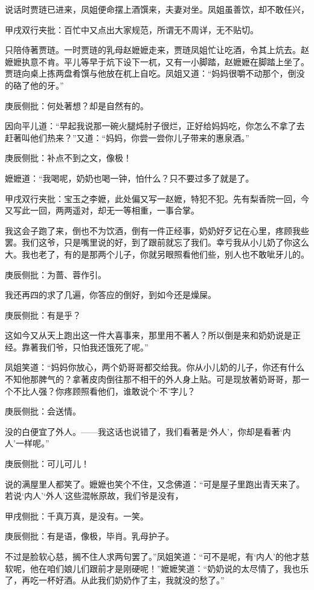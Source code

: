 \begin{parag}


    说话时贾琏已进来，凤姐便命摆上酒馔来，夫妻对坐。凤姐虽善饮，却不敢任兴，\begin{note}甲戌双行夹批：百忙中又点出大家规范，所谓无不周详，无不贴切。\end{note}只陪侍著贾琏。一时贾琏的乳母赵嬷嬷走来，贾琏凤姐忙让吃酒，令其上炕去。赵嬷嬷执意不肯。平儿等早于炕下设下一杌，又有一小脚踏，赵嬷嬷在脚踏上坐了。贾琏向桌上拣两盘肴馔与他放在杌上自吃。凤姐又道：“妈妈很嚼不动那个，倒没的硌了他的牙。”\begin{note}庚辰侧批：何处著想？却是自然有的。\end{note}因向平儿道：“早起我说那一碗火腿炖肘子很烂，正好给妈妈吃，你怎么不拿了去赶著叫他们热来？”又道：“妈妈，你尝一尝你儿子带来的惠泉酒。”\begin{note}庚辰侧批：补点不到之文，像极！\end{note}嬷嬷道：“我喝呢，奶奶也喝一钟，怕什么？只不要过多了就是了。\begin{note}甲戌双行夹批：宝玉之李嬷，此处偏又写一赵嬷，特犯不犯。先有梨香院一回，今又写此一回，两两遥对，却无一等相重，一事合掌。\end{note}我这会子跑了来，倒也不为饮酒，倒有一件正经事，奶奶好歹记在心里，疼顾我些罢。我们这爷，只是嘴里说的好，到了跟前就忘了我们。幸亏我从小儿奶了你这么大。我也老了，有的是那两个儿子，你就另眼照看他们些，别人也不敢呲牙儿的。\begin{note}庚辰侧批：为蔷、蓉作引。\end{note}我还再四的求了几遍，你答应的倒好，到如今还是燥屎。\begin{note}庚辰侧批：有是乎？\end{note}这如今又从天上跑出这一件大喜事来，那里用不著人？所以倒是来和奶奶说是正经。靠著我们爷，只怕我还饿死了呢。”
\end{parag}


\begin{parag}


    凤姐笑道：“妈妈你放心，两个奶哥哥都交给我。你从小儿奶的儿子，你还有什么不知他那脾气的？拿著皮肉倒往那不相干的外人身上贴。可是现放著奶哥哥，那一个不比人强？你疼顾照看他们，谁敢说个‘不’字儿？\begin{note}庚辰侧批：会送情。\end{note}没的白便宜了外人。——我这话也说错了，我们看著是‘外人’，你却是看著‘内人’一样呢。”\begin{note}庚辰侧批：可儿可儿！\end{note}说的满屋里人都笑了。嬷嬷也笑个不住，又念佛道：“可是屋子里跑出青天来了。若说‘内人’‘外人’这些混帐原故，我们爷是没有，\begin{note}甲戌侧批：千真万真，是没有。一笑。\end{note}\begin{note}庚辰侧批：有是语，像极，毕肖。乳母护子。\end{note}不过是脸软心慈，搁不住人求两句罢了。”凤姐笑道：“可不是呢，有‘内人’的他才慈软呢，他在咱们娘儿们跟前才是刚硬呢！”嬷嬷笑道：“奶奶说的太尽情了，我也乐了，再吃一杯好酒。从此我们奶奶作了主，我就没的愁了。”
\end{parag}



